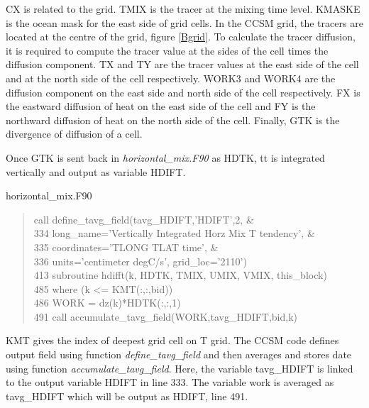 CX is related to the grid. TMIX is the tracer at the mixing time level. KMASKE is the ocean mask for the east side of grid cells. In the CCSM grid, the tracers are located at the centre of the grid, figure \ref{Bgrid}. To calculate the tracer diffusion, it is required to compute the tracer value at the sides of the cell times the diffusion component. TX and TY are the tracer values at the east side of the cell and at the north side of the cell respectively. WORK3 and WORK4 are the diffusion component on the east side and north side of the cell respectively.  FX is the eastward diffusion of heat on the east side of the cell and FY is the northward diffusion of heat on the north side of the cell. Finally, GTK is the divergence of diffusion of a cell. 

Once GTK is sent back in \textit{horizontal\_mix.F90} as HDTK, tt is integrated vertically and output as variable HDIFT. 
\begin{center} horizontal\_mix.F90 \end{center}
\begin{quotation}
\small
\linespread{0.5}\selectfont{} \hspace{1em} call define\_tavg\_field(tavg\_HDIFT,'HDIFT',2,   \&\\
334 \hspace{1em} long\_name='Vertically Integrated Horz Mix T tendency', \&\\
335 \hspace{1em} coordinates='TLONG TLAT time',   \&\\
336 \hspace{1em} units='centimeter degC/s', grid\_loc='2110')\\
413 \hspace{1em} subroutine hdifft(k, HDTK, TMIX, UMIX, VMIX, this\_block)\\
485 \hspace{1em} where (k <= KMT(:,:,bid))\\
486 \hspace{1em} WORK = dz(k)*HDTK(:,:,1)\\
491 \hspace{1em} call accumulate\_tavg\_field(WORK,tavg\_HDIFT,bid,k)
\end{quotation}
KMT gives the index of deepest grid cell on T grid. The CCSM code defines output field using function \textit{define\_tavg\_field} and then averages and stores date using function \textit{accumulate\_tavg\_field}. Here, the variable tavg\_HDIFT is linked to the output variable HDIFT in line 333. The variable work is averaged as tavg\_HDIFT which will be output as HDIFT, line 491. 

